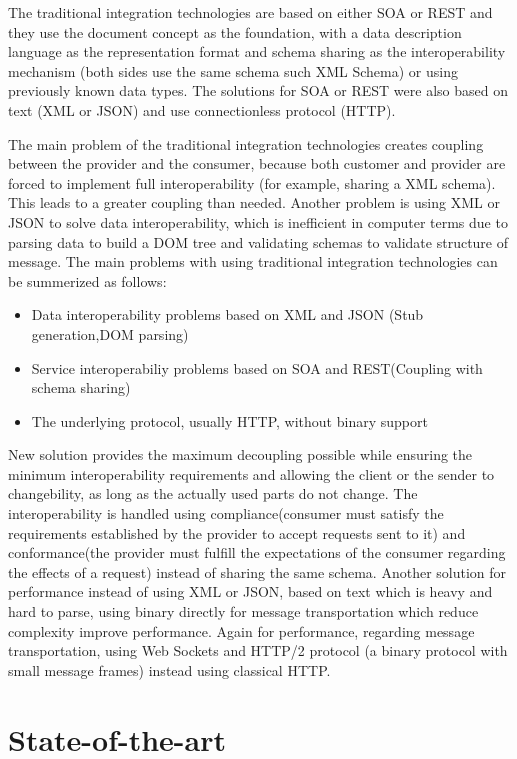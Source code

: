 \documentclass[runningheads,a4paper]{llncs}
\begin{document}
The traditional integration technologies are based on either SOA or REST and they use the document concept as the foundation, with a data description language as the representation format and schema sharing as the interoperability mechanism (both sides use the same schema such XML Schema) or using previously known data types. The solutions for SOA or REST were also based on text (XML or JSON) and use connectionless protocol (HTTP).

The main problem of the traditional integration technologies creates coupling between the provider and the consumer, because both customer and provider are forced to implement full interoperability (for example, sharing a XML schema). This leads to a greater coupling than needed. Another problem is using XML or JSON to solve data interoperability, which is inefficient in computer terms due to parsing data to build a DOM tree and validating schemas to validate structure of message.
The main problems with using traditional integration technologies can be summerized as follows:
\begin{itemize}
  \item Data interoperability problems based on XML and JSON (Stub generation,DOM parsing)
  \item Service interoperabiliy problems based on SOA and REST(Coupling with schema sharing)
  \item The underlying protocol, usually HTTP, without binary support
\end{itemize}

New solution provides the maximum decoupling possible while ensuring the minimum interoperability requirements and allowing the client or the sender to changebility, as long as the actually used parts do not change. The interoperability is handled using compliance(consumer must satisfy the requirements established by the provider to accept requests sent to it)\cite{compliance} and conformance(the provider must fulfill the expectations of the consumer regarding the effects of a request)\cite{comformance} instead of sharing the same schema. Another solution for performance instead of using XML or JSON, based on text which is heavy and hard to parse, using binary directly for message transportation which reduce complexity improve performance. Again for performance, regarding message transportation, using Web Sockets and HTTP/2 protocol (a binary protocol with small message frames) instead using classical HTTP.

\section{State-of-the-art}
\end{document}
